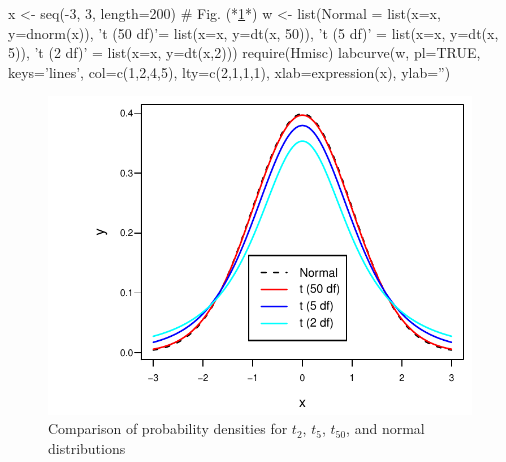 \begin{Schunk}
\begin{Sinput}
x <- seq(-3, 3, length=200)   # Fig. (*\ref{fig:htest-tpdfs}*)
w <- list(Normal     = list(x=x, y=dnorm(x)),
          't (50 df)'= list(x=x, y=dt(x, 50)),
          't (5 df)' = list(x=x, y=dt(x, 5)),
          't (2 df)' = list(x=x, y=dt(x,2)))
require(Hmisc)
labcurve(w, pl=TRUE, keys='lines', col=c(1,2,4,5), lty=c(2,1,1,1),
         xlab=expression(x), ylab='')
\end{Sinput}
\begin{figure}[htbp]

\centerline{\includegraphics{htest-tpdfs-1} }

\caption[$t$ distribution for varying d.f.]{Comparison of probability densities for $t_2$, $t_5$, $t_{50}$, and normal distributions}\label{fig:htest-tpdfs}
\end{figure}
\end{Schunk}


